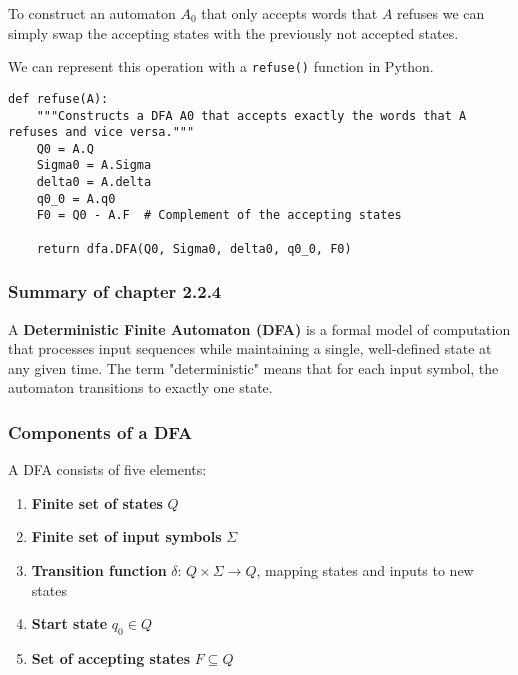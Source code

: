 \documentclass{article}
\begin{document}
To construct an automaton $A_0$ that only accepts words that $A$ refuses we can simply
swap the accepting states with the previously not accepted states.

\begin{center}
\end{center}

We can represent this operation with a \texttt{refuse()} function in Python.

\begin{verbatim}
def refuse(A):
    """Constructs a DFA A0 that accepts exactly the words that A refuses and vice versa."""
    Q0 = A.Q
    Sigma0 = A.Sigma
    delta0 = A.delta
    q0_0 = A.q0
    F0 = Q0 - A.F  # Complement of the accepting states

    return dfa.DFA(Q0, Sigma0, delta0, q0_0, F0)
\end{verbatim}

\subsubsection*{Summary of chapter 2.2.4}

A \textbf{Deterministic Finite Automaton (DFA)} is a formal model of computation that processes input sequences while maintaining a single, well-defined state at any given time. The term "deterministic" means that for each input symbol, the automaton transitions to exactly one state.

\subsubsection*{Components of a DFA}

A DFA consists of five elements:
\begin{enumerate}
    \item \textbf{Finite set of states} \( Q \)
    \item \textbf{Finite set of input symbols} \( \Sigma \)
    \item \textbf{Transition function} \( \delta \): \( Q \times \Sigma \to Q \), mapping states and inputs to new states
    \item \textbf{Start state} \( q_0 \in Q \)
    \item \textbf{Set of accepting states} \( F \subseteq Q \)
\end{enumerate}
\end{document}
